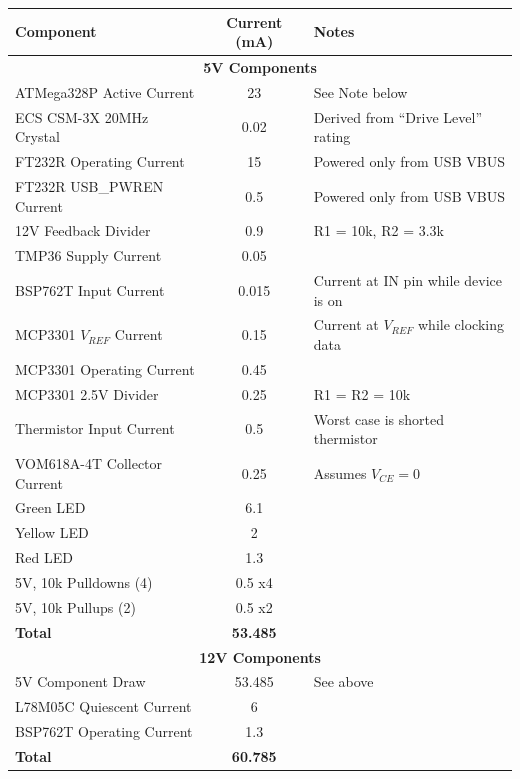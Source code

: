 \documentclass{article}
\begin{document}
\begin{center}
    \begin{tabular}{|l|c|l|}
        \hline
        Component & Current (mA) & Notes \\
        \hline
        \multicolumn{3}{|c|}{\textbf{5V Components}} \\
        \hline
        ATMega328P Active Current & 23 & See Note below \\
        ECS CSM-3X 20MHz Crystal & 0.02 & Derived from ``Drive Level'' rating \\
        FT232R Operating Current & 15 & Powered only from USB VBUS \\
        FT232R USB\_PWREN Current & 0.5 & Powered only from USB VBUS \\
        12V Feedback Divider & 0.9 & R1 = 10k\textOmega{}, R2 = 3.3k\textOmega{} \\
        TMP36 Supply Current & 0.05 & \\
        BSP762T Input Current & 0.015 & Current at IN pin while device is on \\
        MCP3301 $V_{REF}$ Current &  0.15 & Current at $V_{REF}$ while clocking data \\
        MCP3301 Operating Current & 0.45 & \\
        MCP3301 2.5V Divider & 0.25 & R1 = R2 = 10k\textOmega{} \\
        Thermistor Input Current & 0.5 & Worst case is shorted thermistor \\
        VOM618A-4T Collector Current & 0.25 & Assumes $V_{CE} = 0$ \\
        Green LED & 6.1 & \\
        Yellow LED & 2 & \\
        Red LED & 1.3  & \\
        5V, 10k\textOmega{} Pulldowns (4) & 0.5 x4 & \\
        5V, 10k\textOmega{} Pullups (2) & 0.5 x2 & \\
        \textbf{Total} & \textbf{53.485} & \\ 

        \hline
        \hline

        \multicolumn{3}{|c|}{\textbf{12V Components}} \\
        \hline
        5V Component Draw & 53.485 & See above \\
        L78M05C Quiescent Current & 6 & \\
        BSP762T Operating Current & 1.3 & \\
        \textbf{Total} & \textbf{60.785} & \\
        \hline
    \end{tabular}
\end{center}
\end{document}
